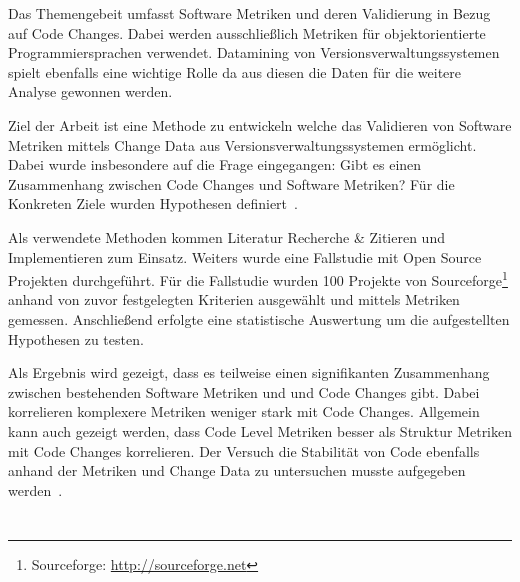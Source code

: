 

 Das Themengebeit umfasst Software Metriken und deren
Validierung in Bezug auf Code Changes. Dabei werden ausschließlich Metriken
für objektorientierte Programmiersprachen verwendet. Datamining von
Versionsverwaltungssystemen spielt ebenfalls eine wichtige Rolle da aus diesen
die Daten für die weitere Analyse gewonnen werden.

 Ziel der Arbeit ist eine Methode zu entwickeln
welche das Validieren von Software Metriken mittels Change Data aus
Versionsverwaltungssystemen ermöglicht. Dabei wurde insbesondere auf die Frage
eingegangen: Gibt es einen Zusammenhang zwischen Code Changes und Software
Metriken? Für die Konkreten Ziele wurden Hypothesen
definiert~\cite[Kap.~6.2,~S.~39]{Mauczka2008}.

 Als verwendete Methoden kommen Literatur
Recherche \& Zitieren und Implementieren zum Einsatz. Weiters wurde eine
Fallstudie mit Open Source Projekten durchgeführt. Für die Fallstudie wurden
100 Projekte von Sourceforge\footnote{Sourceforge:
\url{http://sourceforge.net}} anhand von zuvor festgelegten Kriterien
ausgewählt und mittels Metriken gemessen. Anschließend erfolgte eine
statistische Auswertung um die aufgestellten Hypothesen zu testen.

 Als Ergebnis wird gezeigt, dass es teilweise einen
signifikanten Zusammenhang zwischen bestehenden Software Metriken und und Code
Changes gibt. Dabei korrelieren komplexere Metriken weniger stark mit Code
Changes. Allgemein kann auch gezeigt werden, dass Code Level Metriken besser
als Struktur Metriken mit Code Changes korrelieren. Der Versuch die Stabilität
von Code ebenfalls anhand der Metriken und Change Data zu untersuchen musste
aufgegeben werden~\cite[Kap.~8,~S.~83]{Mauczka2008}.


%
\section*{\thesisheading}


